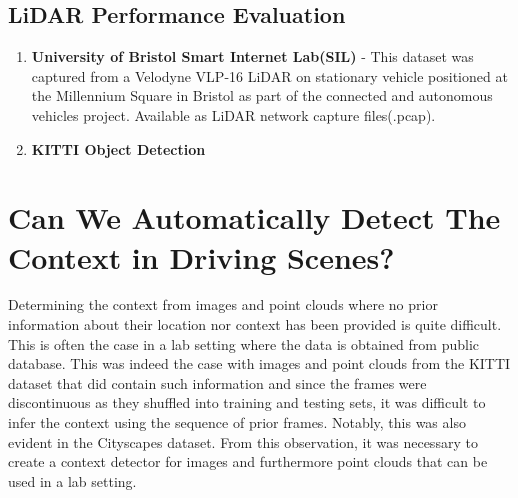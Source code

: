 \subsection{LiDAR Performance Evaluation}

\begin{enumerate}
	\item \textbf{University of Bristol Smart Internet Lab(SIL)} - This dataset was captured from a  Velodyne VLP-16 LiDAR on stationary vehicle positioned at the Millennium Square in Bristol as part of the connected and autonomous vehicles project. Available as LiDAR network capture files(.pcap).
	\item \textbf{KITTI Object Detection}
\end{enumerate}

\section{Can We Automatically Detect The  Context in Driving Scenes?}

Determining the context from images and point clouds where no prior information about their location nor context  has been provided is quite difficult. This is often the case in a lab setting where the data is obtained from public database. This was indeed the case with images and point clouds from the KITTI dataset that did contain such information and since the  frames were discontinuous as they shuffled into training and testing sets, it was difficult to infer the context using the sequence of prior frames. Notably, this was also evident in the Cityscapes dataset. From this observation, it was necessary to create a context detector for images and furthermore point clouds that can be used in a lab setting. 


